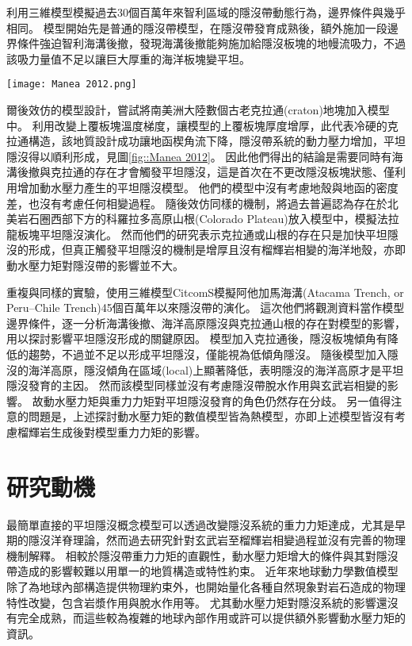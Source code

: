 \citealp{Manea2012Chile}利用三維模型模擬過去30個百萬年來智利區域的隱沒帶動態行為，邊界條件與\citealp{Thermal2012}幾乎相同。
模型開始先是普通的隱沒帶模型，在隱沒帶發育成熟後，額外施加一段邊界條件強迫智利海溝後撤，發現海溝後撤能夠施加給隱沒板塊的地幔流吸力，不過該吸力量值不足以讓巨大厚重的海洋板塊變平坦。

\begin{figure*}[ht!]
    \centering
    \texttt{[image: Manea 2012.png]}
    \caption[\citealp{Manea2012Chile}中的智利平坦隱沒模型]{\citealp{Manea2012Chile}中的智利平坦隱沒模型，模型中同時加入海溝後撤邊界條件與增厚大陸岩石圈可以讓平坦隱沒發育。
    }
    \label{fig::Manea 2012}
\end{figure*}

爾後\citealp{Manea2012Chile}效仿\citealp{o2009subduction}的模型設計，嘗試將南美洲大陸數個古老克拉通(craton)地塊加入模型中。
利用改變上覆板塊溫度梯度，讓模型的上覆板塊厚度增厚，此代表冷硬的克拉通構造，該地質設計成功讓地函楔角流下降，隱沒帶系統的動力壓力增加，平坦隱沒得以順利形成，見圖\ref{fig::Manea 2012}。
因此他們得出的結論是需要同時有海溝後撤與克拉通的存在才會觸發平坦隱沒，這是首次在不更改隱沒板塊狀態、僅利用增加動水壓力產生的平坦隱沒模型。
他們的模型中沒有考慮地殼與地函的密度差，也沒有考慮任何相變過程。
隨後\citealp{Liu2016}效仿同樣的機制，將過去普遍認為存在於北美岩石圈西部下方的科羅拉多高原山根(Colorado Plateau)放入模型中，模擬法拉龍板塊平坦隱沒演化。
然而他們的研究表示克拉通或山根的存在只是加快平坦隱沒的形成，但真正觸發平坦隱沒的機制是增厚且沒有榴輝岩相變的海洋地殼，亦即動水壓力矩對隱沒帶的影響並不大。


\citealp{Hu2016}重複與\citealp{Manea2012Chile}同樣的實驗，使用三維模型CitcomS模擬阿他加馬海溝(Atacama Trench, or Peru–Chile Trench)45個百萬年以來隱沒帶的演化。
這次他們將觀測資料當作模型邊界條件，逐一分析海溝後撤、海洋高原隱沒與克拉通山根的存在對模型的影響，用以探討影響平坦隱沒形成的關鍵原因。
模型加入克拉通後，隱沒板塊傾角有降低的趨勢，不過並不足以形成平坦隱沒，僅能視為低傾角隱沒。
隨後模型加入隱沒的海洋高原，隱沒傾角在區域(local)上顯著降低，表明隱沒的海洋高原才是平坦隱沒發育的主因。
然而該模型同樣並沒有考慮隱沒帶脫水作用與玄武岩相變的影響。
故動水壓力矩與重力力矩對平坦隱沒發育的角色仍然存在分歧。
另一值得注意的問題是，上述探討動水壓力矩的數值模型皆為熱模型，亦即上述模型皆沒有考慮榴輝岩生成後對模型重力力矩的影響。

\section{研究動機}\label{研究動機}
最簡單直接的平坦隱沒概念模型可以透過改變隱沒系統的重力力矩達成，尤其是早期的隱沒洋脊理論，然而過去研究針對玄武岩至榴輝岩相變過程並沒有完善的物理機制解釋。
相較於隱沒帶重力力矩的直觀性，動水壓力矩增大的條件與其對隱沒帶造成的影響較難以用單一的地質構造或特性約束。
近年來地球動力學數值模型除了為地球內部構造提供物理約束外，也開始量化各種自然現象對岩石造成的物理特性改變，包含岩漿作用與脫水作用等。
尤其動水壓力矩對隱沒系統的影響還沒有完全成熟，而這些較為複雜的地球內部作用或許可以提供額外影響動水壓力矩的資訊。

